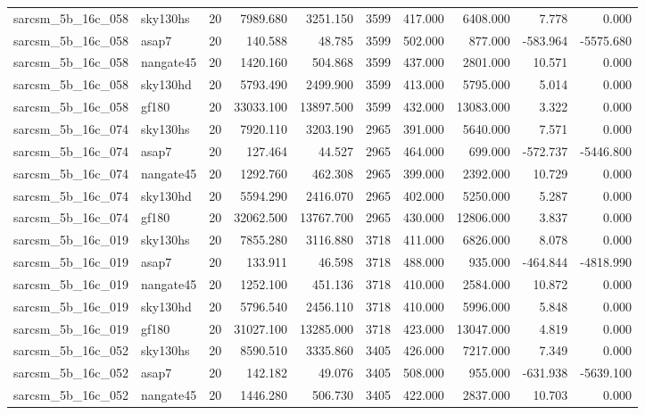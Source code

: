 \begin{tabular}{llrrrrrrrr}
sarcsm\_5b\_16c\_058 & sky130hs & 20 & 7989.680 & 3251.150 & 3599 & 417.000 & 6408.000 & 7.778 & 0.000 \\
sarcsm\_5b\_16c\_058 & asap7 & 20 & 140.588 & 48.785 & 3599 & 502.000 & 877.000 & -583.964 & -5575.680 \\
sarcsm\_5b\_16c\_058 & nangate45 & 20 & 1420.160 & 504.868 & 3599 & 437.000 & 2801.000 & 10.571 & 0.000 \\
sarcsm\_5b\_16c\_058 & sky130hd & 20 & 5793.490 & 2499.900 & 3599 & 413.000 & 5795.000 & 5.014 & 0.000 \\
sarcsm\_5b\_16c\_058 & gf180 & 20 & 33033.100 & 13897.500 & 3599 & 432.000 & 13083.000 & 3.322 & 0.000 \\
sarcsm\_5b\_16c\_074 & sky130hs & 20 & 7920.110 & 3203.190 & 2965 & 391.000 & 5640.000 & 7.571 & 0.000 \\
sarcsm\_5b\_16c\_074 & asap7 & 20 & 127.464 & 44.527 & 2965 & 464.000 & 699.000 & -572.737 & -5446.800 \\
sarcsm\_5b\_16c\_074 & nangate45 & 20 & 1292.760 & 462.308 & 2965 & 399.000 & 2392.000 & 10.729 & 0.000 \\
sarcsm\_5b\_16c\_074 & sky130hd & 20 & 5594.290 & 2416.070 & 2965 & 402.000 & 5250.000 & 5.287 & 0.000 \\
sarcsm\_5b\_16c\_074 & gf180 & 20 & 32062.500 & 13767.700 & 2965 & 430.000 & 12806.000 & 3.837 & 0.000 \\
sarcsm\_5b\_16c\_019 & sky130hs & 20 & 7855.280 & 3116.880 & 3718 & 411.000 & 6826.000 & 8.078 & 0.000 \\
sarcsm\_5b\_16c\_019 & asap7 & 20 & 133.911 & 46.598 & 3718 & 488.000 & 935.000 & -464.844 & -4818.990 \\
sarcsm\_5b\_16c\_019 & nangate45 & 20 & 1252.100 & 451.136 & 3718 & 410.000 & 2584.000 & 10.872 & 0.000 \\
sarcsm\_5b\_16c\_019 & sky130hd & 20 & 5796.540 & 2456.110 & 3718 & 410.000 & 5996.000 & 5.848 & 0.000 \\
sarcsm\_5b\_16c\_019 & gf180 & 20 & 31027.100 & 13285.000 & 3718 & 423.000 & 13047.000 & 4.819 & 0.000 \\
sarcsm\_5b\_16c\_052 & sky130hs & 20 & 8590.510 & 3335.860 & 3405 & 426.000 & 7217.000 & 7.349 & 0.000 \\
sarcsm\_5b\_16c\_052 & asap7 & 20 & 142.182 & 49.076 & 3405 & 508.000 & 955.000 & -631.938 & -5639.100 \\
sarcsm\_5b\_16c\_052 & nangate45 & 20 & 1446.280 & 506.730 & 3405 & 422.000 & 2837.000 & 10.703 & 0.000 \\

\end{tabular}
